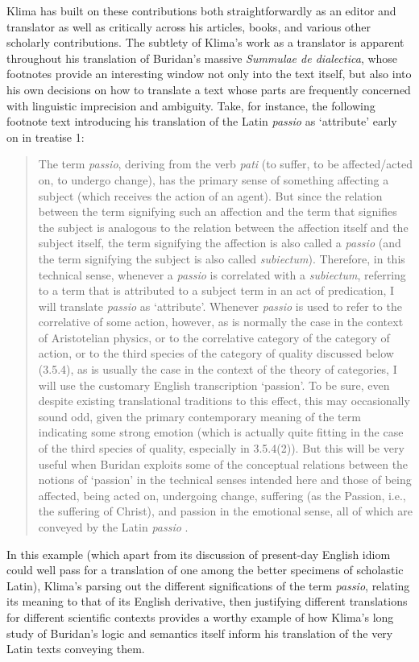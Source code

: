 \documentclass[]{article}
\begin{document}
Klima has built on these contributions 
both straightforwardly as an editor and translator 
as well as critically across his articles, books, and various other scholarly contributions. 
The subtlety of Klima's work as a translator is apparent throughout his translation of Buridan's massive \emph{Summulae de dialectica}, 
whose footnotes provide an interesting window not only into the text itself, 
but also into his own decisions on how to translate a text whose parts are frequently concerned with linguistic imprecision and ambiguity.
Take, for instance, 
the following footnote text introducing his translation of the Latin \emph{passio} as `attribute' early on in treatise 1:
\begin{quote}
	The term \emph{passio}, 
	deriving from the verb \emph{pati} 
	(to suffer, 
	to be affected/acted on, 
	to undergo change), 
	has the primary sense of something affecting a subject 
	(which receives the action of an agent). 
	But since the relation between the term signifying such an affection 
	and the term that signifies the subject 
	is analogous to the relation between the affection itself 
	and the subject itself, 
	the term signifying the affection is also called a \emph{passio} 
	(and the term signifying the
	subject is also called \emph{subiectum}). 
	Therefore, 
	in this technical sense, 
	whenever a \emph{passio} is correlated with a \emph{subiectum}, 
	referring to a term that is attributed to a subject term in an act of predication, 
	I will translate \emph{passio} as `attribute'. 
	Whenever \emph{passio} is used to refer to the correlative of some action, 
	however, 
	as is normally the case in the context of Aristotelian physics,
	or to the correlative category of the category of action, 
	or to the third species of the category of quality discussed below (3.5.4), 
	as is usually the case in the context of the theory of
	categories, 
	I will use the customary English transcription `passion'. 
	To be sure, 
	even despite existing translational traditions to this effect, 
	this may occasionally sound odd, 
	given the primary contemporary meaning of the term indicating some strong emotion (which is actually
	quite fitting in the case of the third species of quality, especially in 3.5.4(2)). 
	But this will be very useful when Buridan exploits some of the conceptual relations between the notions of
	`passion' in the technical senses intended here 
	and those of being affected, 
	being acted on, undergoing change, suffering 
	(as the Passion, i.e., the suffering of Christ), 
	and passion in the emotional sense, all of which are conveyed by the Latin \emph{passio} \autocite[5]{BuridanKlimaSD}.
\end{quote}
In this example
(which apart from its discussion of present-day English idiom could well pass for a translation of one among the better specimens of scholastic Latin), 
Klima's parsing out the different significations of the term \emph{passio}, 
relating its meaning to that of its English derivative, 
then justifying different translations for different scientific contexts 
provides a worthy example of how Klima's long study of Buridan's logic and semantics itself inform his translation of the very Latin texts conveying them.
\end{document}
